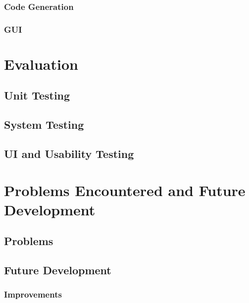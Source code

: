\documentclass{l4proj}
\begin{document}
\subsection{Code Generation}


\subsection{GUI}


\chapter{Evaluation}

\section{Unit Testing}

\section{System Testing}

\section{UI and Usability Testing}

\chapter{Problems Encountered and Future Development}


\section{Problems}


\section{Future Development}


\subsection{Improvements}

\end{document}
